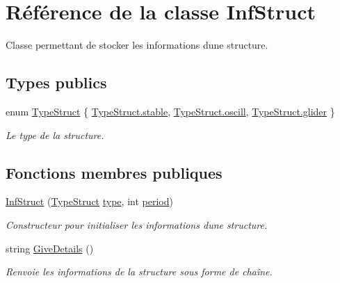\hypertarget{class_inf_struct}{}\section{Référence de la classe Inf\+Struct}
\label{class_inf_struct}


Classe permettant de stocker les informations d\textquotesingle{}une structure.  


\subsection*{Types publics}
\begin{DoxyCompactItemize}
\item 
enum \mbox{\hyperlink{class_inf_struct_a8ae868ec37f73a12d478505a728fcbfd}{Type\+Struct}} \{ \mbox{\hyperlink{class_inf_struct_a8ae868ec37f73a12d478505a728fcbfdaf40faf6384fc85a33d3b05a9d41c012b}{Type\+Struct.\+stable}}, 
\mbox{\hyperlink{class_inf_struct_a8ae868ec37f73a12d478505a728fcbfdafc6fa6bdc2a4c7175a6bda4f6c01c53e}{Type\+Struct.\+oscill}}, 
\mbox{\hyperlink{class_inf_struct_a8ae868ec37f73a12d478505a728fcbfdaa44ded313558535d901ed69e8c16d6ab}{Type\+Struct.\+glider}}
 \}
\begin{DoxyCompactList}\small\item\em Le type de la structure. \end{DoxyCompactList}\end{DoxyCompactItemize}
\subsection*{Fonctions membres publiques}
\begin{DoxyCompactItemize}
\item 
\mbox{\hyperlink{class_inf_struct_a6f047bafac021b8e3bf0db31f0715292}{Inf\+Struct}} (\mbox{\hyperlink{class_inf_struct_a8ae868ec37f73a12d478505a728fcbfd}{Type\+Struct}} \mbox{\hyperlink{class_inf_struct_ab5f36d712d31a76be0d829cc8cc55fa6}{type}}, int \mbox{\hyperlink{class_inf_struct_aca18a5c2da38d672b4129d46a2250a8a}{period}})
\begin{DoxyCompactList}\small\item\em Constructeur pour initialiser les informations d\textquotesingle{}une structure. \end{DoxyCompactList}\item 
string \mbox{\hyperlink{class_inf_struct_a56a6c689c22b39d642a9e44deab28c01}{Give\+Details}} ()
\begin{DoxyCompactList}\small\item\em Renvoie les informations de la structure sous forme de chaîne. \end{DoxyCompactList}\end{DoxyCompactItemize}
